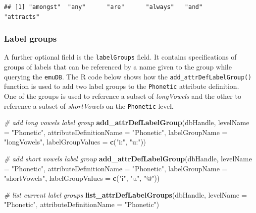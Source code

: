 \documentclass[]{book}
\newenvironment{Shaded}{\begin{snugshade}}{\end{snugshade}}
\newcommand{\CommentTok}[1]{\textcolor[rgb]{0.56,0.35,0.01}{\textit{#1}}}
\newcommand{\DataTypeTok}[1]{\textcolor[rgb]{0.13,0.29,0.53}{#1}}
\newcommand{\KeywordTok}[1]{\textcolor[rgb]{0.13,0.29,0.53}{\textbf{#1}}}
\newcommand{\NormalTok}[1]{#1}
\newcommand{\StringTok}[1]{\textcolor[rgb]{0.31,0.60,0.02}{#1}}
\theoremstyle{definition}
\theoremstyle{definition}
\theoremstyle{definition}
\theoremstyle{remark}
\begin{document}
\begin{verbatim}
## [1] "amongst"  "any"      "are"      "always"   "and"      "attracts"
\end{verbatim}

\hypertarget{label-groups}{%
\subsubsection{Label groups}\label{label-groups}}

A further optional field is the \texttt{labelGroups} field. It contains
specifications of groups of labels that can be referenced by a name
given to the group while querying the \texttt{emuDB}. The R code below
shows how the \texttt{add\_attrDefLabelGroup()} function is used to add
two label groups to the \texttt{Phonetic} attribute definition. One of
the groups is used to reference a subset of \emph{longVowels} and the
other to reference a subset of \emph{shortVowels} on the
\texttt{Phonetic} level.

\begin{Shaded}
\begin{Highlighting}[]
\CommentTok{# add long vowels label group}
\KeywordTok{add_attrDefLabelGroup}\NormalTok{(dbHandle,}
                      \DataTypeTok{levelName =} \StringTok{"Phonetic"}\NormalTok{,}
                      \DataTypeTok{attributeDefinitionName =} \StringTok{"Phonetic"}\NormalTok{,}
                      \DataTypeTok{labelGroupName =} \StringTok{"longVowels"}\NormalTok{,}
                      \DataTypeTok{labelGroupValues =} \KeywordTok{c}\NormalTok{(}\StringTok{"i:"}\NormalTok{, }\StringTok{"u:"}\NormalTok{))}

\CommentTok{# add short vowels label group}
\KeywordTok{add_attrDefLabelGroup}\NormalTok{(dbHandle,}
                      \DataTypeTok{levelName =} \StringTok{"Phonetic"}\NormalTok{,}
                      \DataTypeTok{attributeDefinitionName =} \StringTok{"Phonetic"}\NormalTok{,}
                      \DataTypeTok{labelGroupName =} \StringTok{"shortVowels"}\NormalTok{,}
                      \DataTypeTok{labelGroupValues =} \KeywordTok{c}\NormalTok{(}\StringTok{"i"}\NormalTok{, }\StringTok{"u"}\NormalTok{, }\StringTok{"@"}\NormalTok{))}


\CommentTok{# list current label groups}
\KeywordTok{list_attrDefLabelGroups}\NormalTok{(dbHandle,}
                        \DataTypeTok{levelName =} \StringTok{"Phonetic"}\NormalTok{,}
                        \DataTypeTok{attributeDefinitionName =} \StringTok{"Phonetic"}\NormalTok{)}
\end{Highlighting}
\end{Shaded}
\end{document}
